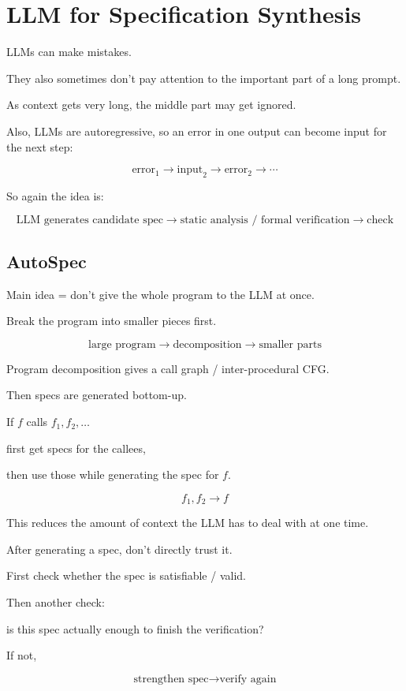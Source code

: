 \documentclass[11pt]{book}
\begin{document}
\setcounter{chapter}{4}
\chapter{LLM for Specification Synthesis}

LLMs can make mistakes.

They also sometimes don't pay attention to the important
part of a long prompt.

As context gets very long, the middle part may get ignored.

Also, LLMs are autoregressive, so an error in one output
can become input for the next step:

\[
\text{error}_1
\rightarrow
\text{input}_2
\rightarrow
\text{error}_2
\rightarrow
\cdots
\]

So again the idea is:

\[
\text{LLM generates candidate spec}
\rightarrow
\text{static analysis / formal verification}
\rightarrow
\text{check}
\]

\section{AutoSpec}

Main idea = don't give the whole program to the LLM at once.

Break the program into smaller pieces first.

\[
\text{large program}
\rightarrow
\text{decomposition}
\rightarrow
\text{smaller parts}
\]

Program decomposition gives a call graph /
inter-procedural CFG.

Then specs are generated bottom-up.

If $f$ calls $f_1,f_2,\ldots$

first get specs for the callees,

then use those while generating the spec for $f$.

\[
f_1,f_2 \rightarrow f
\]

This reduces the amount of context the LLM has to
deal with at one time.

After generating a spec, don't directly trust it.

First check whether the spec is satisfiable / valid.

Then another check:

is this spec actually enough to finish the
verification?

If not,

\[
\text{strengthen spec}
\rightarrow
\text{verify again}
\]
\end{document}
